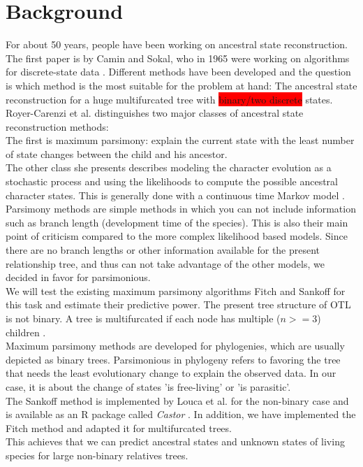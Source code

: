   \section{Background}
    For about 50 years, people have been working on ancestral state reconstruction. The first paper 
      is by Camin and Sokal, who in 1965 were working on algorithms for discrete-state data 
      \cite{Camin1965}. Different methods have been developed and the question is which method is the 
      most suitable for the problem at hand: The ancestral state reconstruction for a huge 
      multifurcated tree with \colorbox{red}{binary/two discrete} states. \\
    Royer-Carenzi et al. distinguishes two major classes of ancestral state reconstruction methods: \\
    The first is maximum parsimony: explain the current state with the least number of state changes 
      between the child and his ancestor. \\
    The other class she presents describes modeling the character evolution as a stochastic process and 
      using the likelihoods to compute the possible ancestral character states. This is generally done 
      with a continuous time Markov model \cite{RoyerCarenzi2013}. \\

    Parsimony methods are simple methods in which you can not include information such as branch 
      length (development time of the species). This is also their main point of criticism compared to 
      the more complex likelihood based models. Since there are no branch lengths or other information 
      available for the present relationship tree, and thus can not take advantage of the 
      other models, we decided in favor for parsimonious. \\

    We will test the existing maximum parsimony algorithms Fitch \cite{Fitch1971} and Sankoff 
      \cite{Sankoff1975} for this task and estimate their predictive power. The present tree structure 
      of OTL is not binary. A tree is multifurcated if each node has multiple ($n >= 3$) children 
      \cite{Felsenstein2003}. \\
    Maximum parsimony methods are developed for phylogenies, which are usually depicted as binary trees.
      Parsimonious in phylogeny refers to favoring the tree that needs the least evolutionary change 
      to explain the observed data. In our case, it is about the change of states 'is free-living' or 
      'is parasitic'. \\
    The Sankoff method is implemented by Louca et al. for the non-binary case and is available as an R 
      package called \textit{Castor} \cite{Louca2017}. In addition, we have implemented the Fitch 
      method and adapted it for multifurcated trees. \\%
    This achieves that we can predict ancestral states and unknown states of living species for large 
      non-binary relatives trees. \\

